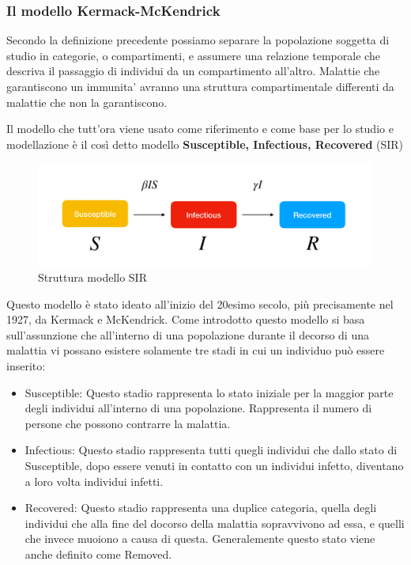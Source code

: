 \subsubsection{Il modello Kermack-McKendrick}
Secondo la definizione precedente possiamo separare la popolazione soggetta di studio 
in categorie, o compartimenti, e assumere una relazione temporale che descriva il passaggio 
di individui da un compartimento all'altro. Malattie che garantiscono un immunita' avranno 
una struttura compartimentale differenti da malattie che non la garantiscono.

Il modello che tutt'ora viene usato come riferimento e come base per 
lo studio e modellazione è il così detto modello 
\textbf{Susceptible, Infectious, Recovered} (SIR)

\begin{figure}[h]
    \includegraphics[width=\linewidth]{img/sir.png}
    \caption{Struttura modello SIR} 
    \label{fig:SIR_Structure}
\end{figure}

Questo modello è stato ideato all'inizio del 20esimo secolo, 
più precisamente nel 1927, da Kermack e McKendrick. Come introdotto questo modello
si basa sull'assunzione che all'interno di una popolazione durante 
il decorso di una malattia vi possano esistere solamente tre stadi in cui 
un individuo può essere inserito: 

\begin{itemize}
    \item Susceptible: Questo stadio rappresenta lo stato iniziale per la maggior parte
    degli individui all'interno di una popolazione. Rappresenta il numero di 
    persone che possono contrarre la malattia.
    \item Infectious: Questo stadio rappresenta tutti quegli individui che dallo 
    stato di Susceptible, dopo essere venuti in contatto con un individui infetto, 
    diventano a loro volta individui infetti.
    \item Recovered: Questo stadio rappresenta una duplice categoria, quella degli
    individui che alla fine del docorso della malattia sopravvivono ad essa, e 
    quelli che invece muoiono a causa di questa. Generalemente questo stato viene
    anche definito come Removed.
\end{itemize}

